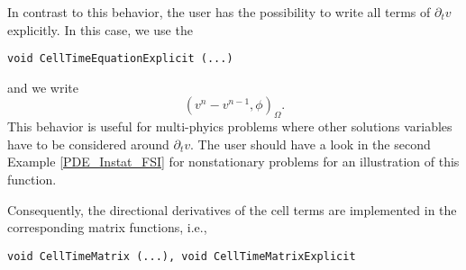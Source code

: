 In contrast to this behavior, the user 
has the possibility to write all terms of 
$\partial_t v$ explicitly. In this case, we 
use the 
\begin{verbatim}
void CellTimeEquationExplicit (...) 
\end{verbatim}
and we write 
\begin{equation*}
(v^n - v^{n-1}, \phi)_{\Omega}.
\end{equation*}
This behavior is useful for multi-phyics problems
where other solutions variables have to be considered
around $\partial_t v$. The user should have a look 
in the second Example 
\ref{PDE_Instat_FSI} for nonstationary problems 
for an illustration
of this function. 

Consequently, the directional derivatives of the 
cell terms are implemented in the corresponding
matrix functions, i.e., 
\begin{verbatim}
void CellTimeMatrix (...), void CellTimeMatrixExplicit 
\end{verbatim}


